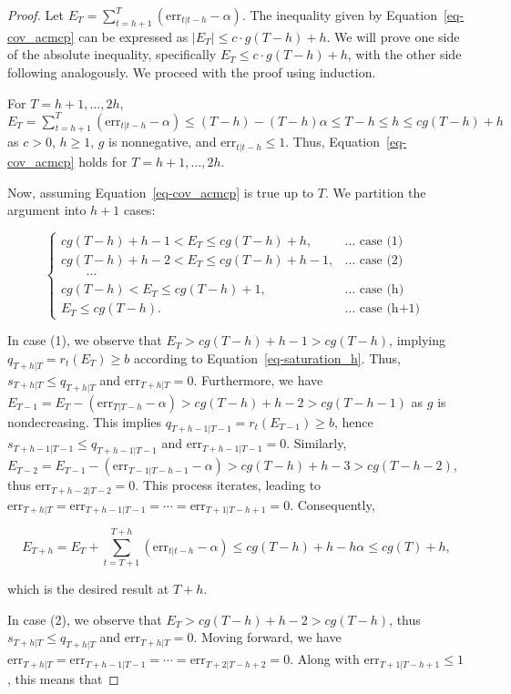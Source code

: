 \documentclass[
  11pt,
  a4paper,
]{article}
\theoremstyle{plain}
\theoremstyle{plain}
\theoremstyle{remark}
\begin{document}
\begin{proof}
Let \(E_T=\sum_{t=h+1}^{T}\left(\mathrm{err}_{t|t-h}-\alpha\right)\).
The inequality given by Equation~\ref{eq-cov_acmcp} can be expressed as
\(\left|E_T\right| \leq c \cdot g(T-h) + h\). We will prove one side of
the absolute inequality, specifically \(E_T \leq c \cdot g(T-h) + h\),
with the other side following analogously. We proceed with the proof
using induction.

For \(T=h+1,\ldots,2h\),
\(E_T = \sum_{t=h+1}^{T}(\mathrm{err}_{t|t-h}-\alpha) \leq (T-h)-(T-h)\alpha \leq T-h \leq h \leq cg(T-h) + h\)
as \(c>0\), \(h\geq 1\), \(g\) is nonnegative, and
\(\mathrm{err}_{t|t-h} \leq 1\). Thus, Equation~\ref{eq-cov_acmcp} holds
for \(T=h+1,\ldots,2h\).

Now, assuming Equation~\ref{eq-cov_acmcp} is true up to \(T\). We
partition the argument into \(h+1\) cases:

\[
\begin{cases}
cg(T-h)+h-1 < E_T \leq cg(T-h)+h, & \ldots \text { case (1) } \\
cg(T-h)+h-2 < E_T \leq cg(T-h)+h-1, & \ldots \text { case (2) } \\
\qquad \cdots \\
cg(T-h) < E_T \leq cg(T-h)+1, & \ldots \text { case (h) } \\
E_T \leq cg(T-h). & \ldots \text { case (h+1) }
\end{cases}
\]

In case (1), we observe that \(E_T > cg(T-h)+h-1 > cg(T-h)\), implying
\(q_{T+h|T} = r_t(E_{T}) \geq b\) according to
Equation~\ref{eq-saturation_h}. Thus, \(s_{T+h|T} \leq q_{T+h|T}\) and
\(\mathrm{err}_{T+h|T} = 0\). Furthermore, we have
\(E_{T-1} = E_T - (\mathrm{err}_{T|T-h} - \alpha) > cg(T-h)+h-2 > cg(T-h-1)\)
as \(g\) is nondecreasing. This implies
\(q_{T+h-1|T-1} = r_t(E_{T-1}) \geq b\), hence
\(s_{T+h-1|T-1} \leq q_{T+h-1|T-1}\) and
\(\mathrm{err}_{T+h-1|T-1} = 0\). Similarly,
\(E_{T-2} = E_{T-1} - (\mathrm{err}_{T-1|T-h-1} - \alpha) > cg(T-h)+h-3 > cg(T-h-2)\),
thus \(\mathrm{err}_{T+h-2|T-2} = 0\). This process iterates, leading to
\(\mathrm{err}_{T+h|T} = \mathrm{err}_{T+h-1|T-1} = \cdots = \mathrm{err}_{T+1|T-h+1} = 0\).
Consequently,

\[
E_{T+h} = E_T+\sum_{t=T+1}^{T+h}(\mathrm{err}_{t|t-h}-\alpha) \leq cg(T-h)+h-h\alpha \leq cg(T)+h,
\]

which is the desired result at \(T+h\).

In case (2), we observe that \(E_T > cg(T-h)+h-2 > cg(T-h)\), thus
\(s_{T+h|T} \leq q_{T+h|T}\) and \(\mathrm{err}_{T+h|T} = 0\). Moving
forward, we have
\(\mathrm{err}_{T+h|T} = \mathrm{err}_{T+h-1|T-1} = \cdots = \mathrm{err}_{T+2|T-h+2} = 0\).
Along with \(\mathrm{err}_{T+1|T-h+1} \leq 1\), this means that


\end{proof}
\end{document}
